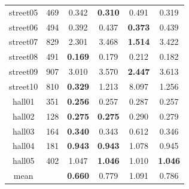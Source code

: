 \documentclass[letterpaper, 10 pt, conference]{ieeeconf}  %
\newcommand{\COMMENT}[1]{\textcolor{red}{ (#1) }}
\begin{document}
\begin{table}[htb!]
\begin{tabular}{c|c|c|c|c|c}
                street05             & 469      & 0.342                & \textbf{0.310}         & 0.491                    & 0.319                      \\
                street06             & 494      & 0.392                & 0.437                  & \textbf{0.373}           & 0.439                      \\
                street07             & 829      & 2.301                & 3.468                  & \textbf{1.514}           & 3.422                      \\
                street08             & 491      & \textbf{0.169}       & 0.179                  & 0.212                    & 0.182                      \\
                street09             & 907      & 3.010                & 3.570                  & \textbf{2.447}           & 3.613                      \\
                street10             & 810      & \textbf{0.329}       & 1.213                  & 8.097                    & 1.256                      \\
                hall01               & 351      & \textbf{0.256}       & 0.257                  & 0.287                    & 0.257                      \\
                hall02               & 128      & \textbf{0.275}       & \textbf{0.275}         & 0.290                    & 0.279                      \\
                hall03               & 164      & \textbf{0.340}       & 0.343                  & 0.612                    & 0.346                      \\
                hall04               & 181      & \textbf{0.943}       & \textbf{0.943}         & 1.078                    & 0.945                      \\
                hall05               & 402      & 1.047                & \textbf{1.046}         & 1.010                    & \textbf{1.046}             \\
                \midrule
                mean                 &          & \textbf{0.660}       & 0.779                  & 1.091                    & 0.786                      \\
                \bottomrule
        \end{tabular}
        \label{tab_m2dgr}
\end{table}
\end{document}
